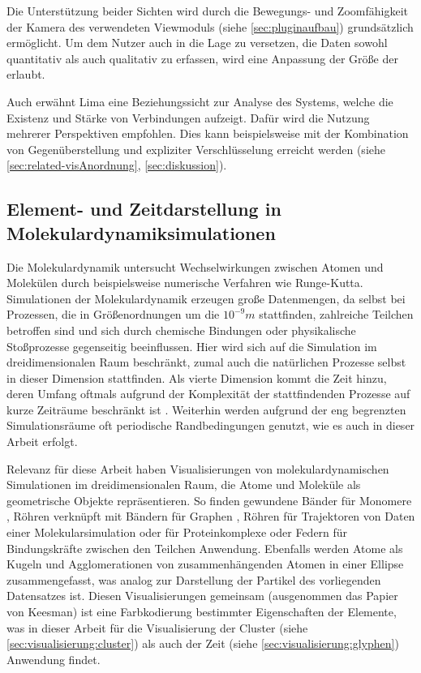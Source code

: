 Die Unterstützung beider Sichten wird durch die Bewegungs- und Zoomfähigkeit der Kamera des verwendeten  Viewmoduls (siehe \autoref{sec:pluginaufbau}) grundsätzlich ermöglicht. Um dem Nutzer auch in die Lage zu versetzen, die Daten sowohl quantitativ als auch qualitativ zu erfassen, wird eine Anpassung der Größe der  erlaubt.

Auch erwähnt Lima eine Beziehungssicht zur Analyse des Systems, welche die Existenz und Stärke von Verbindungen aufzeigt. Dafür wird die Nutzung mehrerer Perspektiven empfohlen. Dies kann beispielsweise mit der Kombination von Gegenüberstellung und expliziter Verschlüsselung erreicht werden (siehe \autoref{sec:related-visAnordnung}, \autoref{sec:diskussion}). %

\subsection*{Element- und Zeitdarstellung in Molekulardynamiksimulationen}

Die Molekulardynamik untersucht Wechselwirkungen zwischen Atomen und Molekülen durch beispielsweise numerische Verfahren wie Runge-Kutta. Simulationen der Molekulardynamik erzeugen große Datenmengen, da selbst bei Prozessen, die in Größenordnungen um die $10^{-9}m$ stattfinden, zahlreiche Teilchen betroffen sind und sich durch chemische Bindungen oder physikalische Stoßprozesse gegenseitig beeinflussen. Hier wird sich auf die Simulation im dreidimensionalen Raum beschränkt, zumal auch die natürlichen Prozesse selbst in dieser Dimension stattfinden. Als vierte Dimension kommt die Zeit hinzu, deren Umfang oftmals aufgrund der Komplexität der stattfindenden Prozesse auf kurze Zeiträume beschränkt ist \cite{bylaska2013extendingTimeMD}. Weiterhin werden aufgrund der eng begrenzten Simulationsräume oft periodische Randbedingungen genutzt, wie es auch in dieser Arbeit erfolgt. %

Relevanz für diese Arbeit haben Visualisierungen von molekulardynamischen Simulationen im dreidimensionalen Raum, die Atome und Moleküle als geometrische Objekte repräsentieren. So finden gewundene Bänder für Monomere \cite{cohen2007proteins}, Röhren verknüpft mit Bändern für Graphen \cite{sathe2011graphene}, Röhren für Trajektoren von Daten einer Molekularsimulation \cite{grottel2014trajectories} oder für Proteinkomplexe \cite{small2013ribosomal} \cite{cao2013cancer} oder Federn für Bindungskräfte zwischen den Teilchen \cite{keesman2013springs} \cite{mcBride2013pathIntegral_web} Anwendung. Ebenfalls werden \cite{vis07grottel} Atome als Kugeln und Agglomerationen von zusammenhängenden Atomen in einer Ellipse zusammengefasst, was analog zur Darstellung der Partikel des vorliegenden Datensatzes ist. Diesen Visualisierungen gemeinsam (ausgenommen das Papier von Keesman) ist eine Farbkodierung bestimmter Eigenschaften der Elemente, was in dieser Arbeit für die Visualisierung der Cluster (siehe \autoref{sec:visualisierung:cluster}) als auch der Zeit (siehe \autoref{sec:visualisierung:glyphen}) Anwendung findet.

